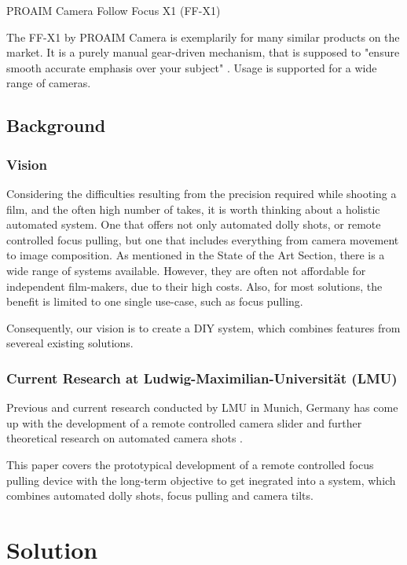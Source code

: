 \documentclass{sigchi}
\begin{document}
PROAIM Camera Follow Focus X1 (FF-X1)

The FF-X1 by PROAIM Camera is exemplarily for many similar products on the market. It is a purely manual gear-driven mechanism, that is supposed to "ensure smooth accurate emphasis over your subject" \cite{proaim}. Usage is supported for a wide range of cameras. 


\subsection{Background}

\subsubsection{Vision}

Considering the difficulties resulting from the precision required while shooting a film, and the often high number of takes, it is worth thinking about a holistic automated system. One that offers not only automated dolly shots, or remote controlled focus pulling, but one that includes everything from camera movement to image composition. As mentioned in the State of the Art Section, there is a wide range of systems available. However, they are often not affordable for independent film-makers, due to their high costs. Also, for most solutions, the benefit is limited to one single use-case, such as focus pulling. 

Consequently, our vision is to create a DIY system, which combines features from severeal existing solutions.    


\subsubsection{Current Research at Ludwig-Maximilian-Universit\"at (LMU)}

Previous and current research conducted by LMU in Munich, Germany has come up with the development of a remote controlled camera slider \cite{pmoerwald} and further theoretical research on automated camera shots \cite{pburgdorf}. 

This paper covers the prototypical development of a remote controlled focus pulling device with the long-term objective to get inegrated into a system, which combines automated dolly shots, focus pulling and camera tilts.

\section{Solution}
\end{document}
